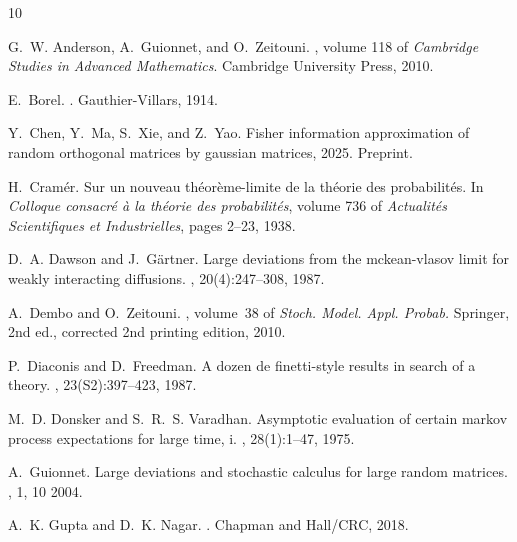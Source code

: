 \documentclass[11pt,a4paper,twoside]{article}
\theoremstyle{definition}
\begin{document}
\begin{thebibliography}{10}

G.~W. Anderson, A.~Guionnet, and O.~Zeitouni.
, volume 118 of {\em Cambridge Studies in Advanced Mathematics}.
\newblock Cambridge University Press, 2010.

E.~Borel.
.
\newblock Gauthier-Villars, 1914.

Y.~Chen, Y.~Ma, S.~Xie, and Z.~Yao.
\newblock Fisher information approximation of random orthogonal matrices by gaussian matrices, 2025.
\newblock Preprint.

H.~Cramér.
\newblock Sur un nouveau théorème-limite de la théorie des probabilités.
\newblock In {\em Colloque consacré à la théorie des probabilités}, volume 736 of {\em Actualités Scientifiques et Industrielles}, pages 2--23, 1938.

D.~A. Dawson and J.~G{\"a}rtner.
\newblock Large deviations from the mckean-vlasov limit for weakly interacting diffusions.
, 20(4):247--308, 1987.

A.~Dembo and O.~Zeitouni.
, volume~38 of {\em Stoch. Model. Appl. Probab.}
\newblock Springer, 2nd ed., corrected 2nd printing edition, 2010.

P.~Diaconis and D.~Freedman.
\newblock A dozen de finetti-style results in search of a theory.
, 23(S2):397--423, 1987.

M.~D. Donsker and S.~R.~S. Varadhan.
\newblock Asymptotic evaluation of certain markov process expectations for large time, i.
, 28(1):1--47, 1975.

A.~Guionnet.
\newblock Large deviations and stochastic calculus for large random matrices.
, 1, 10 2004.

A.~K. Gupta and D.~K. Nagar.
.
\newblock Chapman and Hall/CRC, 2018.


\end{thebibliography}
\end{document}
